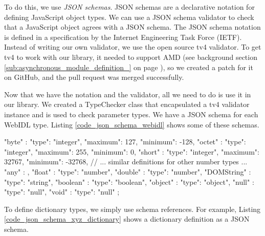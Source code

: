 To do this, we use \emph{JSON schemas}. JSON schemas are a declarative notation for defining JavaScript object types. We can use a JSON schema validator to check that a JavaScript object agrees with a JSON schema. The JSON schema notation is defined in a specification by the Internet Engineering Task Force (IETF)\cite{jsonschemaspec}. Instead of writing our own validator, we use the open source tv4 validator\cite{tvjsonschema}. To get tv4 to work with our library, it needed to support AMD (see background section \ref{sub:asynchronous_module_definition_} on page \pageref{sub:asynchronous_module_definition_}), so we created a patch for it on GitHub, and the pull request was merged successfully. 

Now that we have the notation and the validator, all we need to do is use it in our library. We created a TypeChecker class that encapsulated a tv4 validator instance and is used to check parameter types. We have a JSON schema for each WebIDL type. Listing \ref{code_json_schema_webidl} shows some of these schemas.

\begin{code}
{
  "byte"               : {"type": "integer", "maximum": 127, 
                                             "minimum": -128},
  "octet"              : {"type": "integer", "maximum": 255, 
                                             "minimum": 0},
  "short"              : {"type": "integer", "maximum": 32767, 
                                             "minimum": -32768},
  // ... similar definitions for other number types ...
  "any"                : {},
  "float"              : {"type": "number"},
  "double"             : {"type": "number"},
  "DOMString"          : {"type": "string"},
  "boolean"            : {"type": "boolean"},
  "object"             : {"type": "object"},
  "null"               : {"type": "null"},
  "void"               : {"type": "null"}
};
\end{code}

To define dictionary types, we simply use schema references. For example, Listing \ref{code_json_schema_xyz_dictionary} shows a dictionary definition as a JSON schema.


